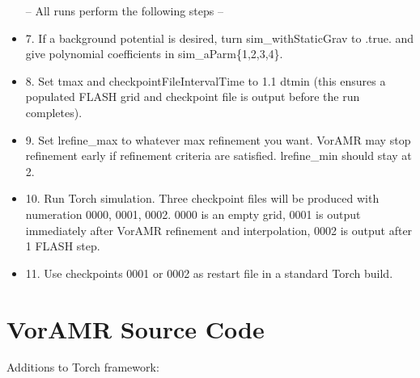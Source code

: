 \documentclass[twoside]{drexel-thesis}
\begin{document}
\begin{itemize}
-- All runs perform the following steps --\\

    \item [] 7. If a background potential is desired, turn sim\_withStaticGrav to .true. and give polynomial coefficients in sim\_aParm\{1,2,3,4\}.
    \item [] 8. Set tmax and checkpointFileIntervalTime to 1.1 dtmin (this ensures a populated FLASH grid and checkpoint file is output before the run completes).
    \item [] 9. Set lrefine\_max to whatever max refinement you want. VorAMR may stop refinement early if refinement criteria are satisfied. lrefine\_min should stay at 2.
    \item [] 10. Run Torch simulation. Three checkpoint files will be produced with numeration 0000, 0001, 0002. 0000 is an empty grid, 0001 is output immediately after VorAMR refinement and interpolation, 0002 is output after 1 FLASH step.
    \item [] 11. Use checkpoints 0001 or 0002 as restart file in a standard Torch build.
\end{itemize}

\section{VorAMR Source Code}\label{app:voramrsource}
Additions to Torch framework:
\end{document}
